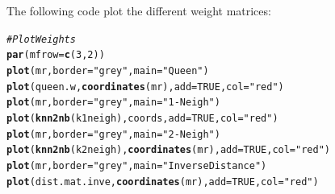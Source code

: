 \documentclass[english,12pt]{book}\usepackage[]{graphicx}\usepackage[]{xcolor}
\makeatletter
\newcommand{\hlnum}[1]{\textcolor[rgb]{0.686,0.059,0.569}{#1}}%
\newcommand{\hlstr}[1]{\textcolor[rgb]{0.192,0.494,0.8}{#1}}%
\newcommand{\hlcom}[1]{\textcolor[rgb]{0.678,0.584,0.686}{\textit{#1}}}%
\newcommand{\hlstd}[1]{\textcolor[rgb]{0.345,0.345,0.345}{#1}}%
\newcommand{\hlkwc}[1]{\textcolor[rgb]{0.333,0.667,0.333}{#1}}%
\newcommand{\hlkwd}[1]{\textcolor[rgb]{0.737,0.353,0.396}{\textbf{#1}}}%
\newenvironment{kframe}{%
 \def\at@end@of@kframe{}%
 \ifinner\ifhmode%
  \def\at@end@of@kframe{\end{minipage}}%
  \begin{minipage}{\columnwidth}%
 \fi\fi%
 \def\FrameCommand##1{\hskip\@totalleftmargin \hskip-\fboxsep
 \colorbox{shadecolor}{##1}\hskip-\fboxsep
     \hskip-\linewidth \hskip-\@totalleftmargin \hskip\columnwidth}%
 \MakeFramed {\advance\hsize-\width
   \@totalleftmargin\z@ \linewidth\hsize
   \@setminipage}}%
 {\par\unskip\endMakeFramed%
 \at@end@of@kframe}
\newenvironment{knitrout}{}{} %
\makeatother
\begin{document}



The following code plot the different weight matrices: 


\begin{knitrout}
\color{fgcolor}\begin{kframe}
\begin{alltt}
\hlcom{# Plot Weights}
\hlkwd{par}\hlstd{(}\hlkwc{mfrow} \hlstd{=} \hlkwd{c}\hlstd{(}\hlnum{3}\hlstd{,} \hlnum{2}\hlstd{))}
\hlkwd{plot}\hlstd{(mr,} \hlkwc{border} \hlstd{=} \hlstr{"grey"}\hlstd{,} \hlkwc{main} \hlstd{=} \hlstr{"Queen"}\hlstd{)}
\hlkwd{plot}\hlstd{(queen.w,} \hlkwd{coordinates}\hlstd{(mr),} \hlkwc{add} \hlstd{=}  \hlnum{TRUE}\hlstd{,} \hlkwc{col} \hlstd{=} \hlstr{"red"}\hlstd{)}
\hlkwd{plot}\hlstd{(mr,} \hlkwc{border} \hlstd{=} \hlstr{"grey"}\hlstd{,} \hlkwc{main} \hlstd{=} \hlstr{"1-Neigh"}\hlstd{)}
\hlkwd{plot}\hlstd{(}\hlkwd{knn2nb}\hlstd{(k1neigh), coords,} \hlkwc{add} \hlstd{=} \hlnum{TRUE}\hlstd{,} \hlkwc{col} \hlstd{=} \hlstr{"red"}\hlstd{)}
\hlkwd{plot}\hlstd{(mr,} \hlkwc{border} \hlstd{=} \hlstr{"grey"}\hlstd{,} \hlkwc{main} \hlstd{=} \hlstr{"2-Neigh"}\hlstd{)}
\hlkwd{plot}\hlstd{(}\hlkwd{knn2nb}\hlstd{(k2neigh),} \hlkwd{coordinates}\hlstd{(mr),} \hlkwc{add} \hlstd{=} \hlnum{TRUE}\hlstd{,} \hlkwc{col} \hlstd{=} \hlstr{"red"}\hlstd{)}
\hlkwd{plot}\hlstd{(mr,} \hlkwc{border} \hlstd{=} \hlstr{"grey"}\hlstd{,} \hlkwc{main} \hlstd{=} \hlstr{"Inverse Distance"}\hlstd{)}
\hlkwd{plot}\hlstd{(dist.mat.inve,} \hlkwd{coordinates}\hlstd{(mr),} \hlkwc{add} \hlstd{=}  \hlnum{TRUE}\hlstd{,} \hlkwc{col} \hlstd{=} \hlstr{"red"}\hlstd{)}
\end{alltt}
\end{kframe}
\end{knitrout}
\end{document}
